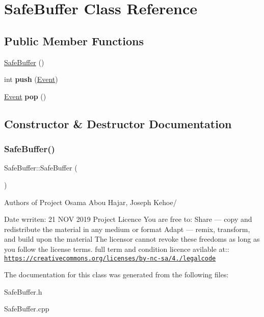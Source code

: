 \hypertarget{classSafeBuffer}{}\section{Safe\+Buffer Class Reference}
\label{classSafeBuffer}
\subsection*{Public Member Functions}
\begin{DoxyCompactItemize}
\item 
\hyperlink{classSafeBuffer_af835d8d08c4dcd3326f21ae2e9988699}{Safe\+Buffer} ()
\item 
\mbox{\label{classSafeBuffer_ac3ed0799ec2e84c97e36b22c83f7abf5}} 
int {\bfseries push} (\hyperlink{classEvent}{Event})
\item 
\mbox{\label{classSafeBuffer_a90a33fca4d838f7c0eef6e8557f3c281}} 
\hyperlink{classEvent}{Event} {\bfseries pop} ()
\end{DoxyCompactItemize}


\subsection{Constructor \& Destructor Documentation}
\mbox{\label{classSafeBuffer_af835d8d08c4dcd3326f21ae2e9988699}} 
\subsubsection{\texorpdfstring{Safe\+Buffer()}{SafeBuffer()}}
{\footnotesize\ttfamily Safe\+Buffer\+::\+Safe\+Buffer (\begin{DoxyParamCaption}{ }\end{DoxyParamCaption})}

Authors of Project Osama Abou Hajar, Joseph Kehoe/

Date wrriten\+: 21 N\+OV 2019 Project Licence You are free to\+: Share — copy and redistribute the material in any medium or format Adapt — remix, transform, and build upon the material The licensor cannot revoke these freedoms as long as you follow the license terms. full term and condition licence avilable at\+:\+: \href{https://creativecommons.org/licenses/by-nc-sa/4.0/legalcode}{\tt https\+://creativecommons.\+org/licenses/by-\/nc-\/sa/4./legalcode} 

The documentation for this class was generated from the following files\+:\begin{DoxyCompactItemize}
\item 
Safe\+Buffer.\+h\item 
Safe\+Buffer.\+cpp\end{DoxyCompactItemize}
